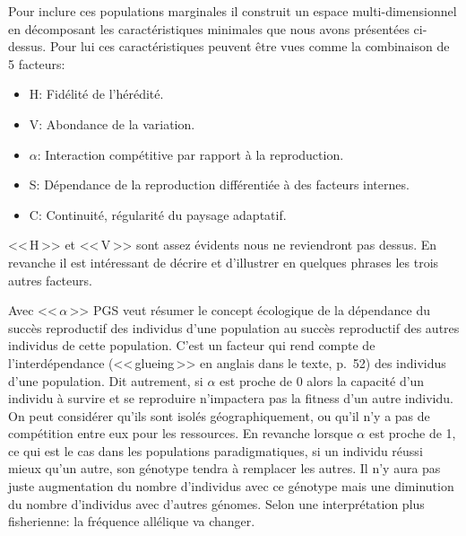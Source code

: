 Pour inclure ces populations marginales il construit un espace multi-dimensionnel en décomposant les caractéristiques minimales que nous avons présentées ci-dessus. Pour lui ces caractéristiques peuvent être vues comme la combinaison de 5 facteurs: 
\begin{itemize}
	\item H: Fidélité de l'hérédité.
	\item V: Abondance de la variation.
	\item $\alpha$: Interaction compétitive par rapport à la reproduction.
	\item S: Dépendance de la reproduction différentiée à des facteurs internes.
	\item C: Continuité, régularité du paysage adaptatif.
\end{itemize}


<<\,H\,>> et <<\,V\,>> sont assez évidents nous ne reviendront pas dessus. En revanche il est intéressant de décrire et d'illustrer en quelques phrases les trois autres facteurs.

Avec <<\,$\alpha$\,>> PGS veut résumer le concept écologique de la dépendance du succès reproductif des individus d'une population au succès reproductif des autres individus de cette population. C'est un facteur qui rend compte de l'interdépendance (<<\,glueing\,>> en anglais dans le texte, p.~52) des individus d'une population. Dit autrement, si $\alpha$ est proche de 0 alors la capacité d'un individu à survire et se reproduire n'impactera pas la fitness d'un autre individu. On peut considérer qu'ils sont isolés géographiquement, ou qu'il n'y a pas de compétition entre eux pour les ressources. En revanche lorsque $\alpha$ est proche de 1, ce qui est le cas dans les populations paradigmatiques, si un individu réussi mieux qu'un autre, son génotype tendra à remplacer les autres. Il n'y aura pas juste augmentation du nombre d'individus avec ce génotype mais une diminution du nombre d'individus avec d'autres génomes. Selon une interprétation plus fisherienne: la fréquence allélique va changer.

